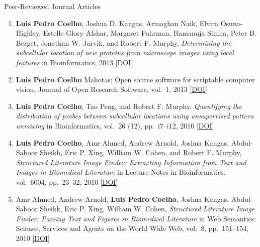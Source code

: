 \documentclass{article}
\renewcommand\subsection[1]{%
    \par\vspace{.1em}%
    {\hspace{1em}\subsubhead #1}%
    \par\vspace{.2em}%
}
\newcommand\showdoi[1]{%
    \href{http://dx.doi.org/#1}{[DOI]}%
}
\begin{document}
\subsection{Peer-Reviewed Journal Articles}
\begin{enumerate}
\item \textbf{Luis Pedro Coelho}, Joshua D.  Kangas, Armaghan Naik, Elvira
Osuna-Highley, Estelle Glory-Afshar, Margaret Fuhrman, Ramanuja Simha, Peter B.
Berget, Jonathan W.  Jarvik, and Robert F. Murphy, \emph{Determining the
subcellular location of new proteins from microscope images using local
features} in Bioinformatics, 2013 \showdoi{10.1093/bioinformatics/btt392}

\item \textbf{Luis Pedro Coelho} Mahotas: Open source software for scriptable
computer vision, Journal of Open Research Software, vol.\ 1, 2013
\showdoi{10.5334/jors.ac}

\item \textbf{Luis Pedro Coelho}, Tao Peng, and Robert F. Murphy,
\emph{Quantifying the distribution of probes between subcellular locations
using unsupervised pattern unmixing} in Bioinformatics, vol.\ 26 (12), pp.\
i7--i12, 2010 \showdoi{10.1093/bioinformatics/btq220}

\item \textbf{Luis Pedro Coelho}, Amr Ahmed, Andrew Arnold, Joshua Kangas,
Abdul-Saboor Sheikh, Eric P. Xing, William W. Cohen, and Robert F. Murphy,
\emph{Structured Literature Image Finder: Extracting Information from Text and
Images in Biomedical Literature} in Lecture Notes in Bioinformatics, vol.\
6004, pp.\ 23--32, 2010 \showdoi{10.1007/978-3-642-13131-8_4}

\item Amr Ahmed, Andrew Arnold, \textbf{Luis Pedro Coelho}, Joshua Kangas,
Abdul-Saboor Sheikk, Eric P. Xing, William W. Cohen, \emph{Structured
Literature Image Finder: Parsing Text and Figures in Biomedical Literature} in
Web Semantics: Science, Services and Agents on the World Wide Web, vol.\ 8,
pp.\ 151--154, 2010 \showdoi{10.1016/j.websem.2010.04.002}
\end{enumerate}
\end{document}
